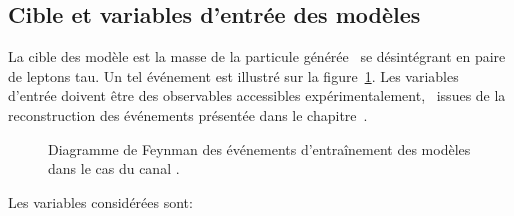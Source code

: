 \subsection{Cible et variables d'entrée des modèles}\label{chapter-ML-section-evt_gen-inputs}
La cible des modèle est la masse de la particule générée \higgsML\ se désintégrant en paire de leptons tau.
Un tel événement est illustré sur la figure~\ref{fig-model_inputs-fgraph-H-BBtautau_mutau_small}.
Les variables d'entrée doivent être des observables accessibles expérimentalement,
\ie\ issues de la reconstruction des événements présentée dans le chapitre~.
\begin{figure}[h]
\centering
{\def\Higgs{\higgsML}}
\caption[Diagramme de Feynman des événements d'entraînement des modèles.]{Diagramme de Feynman des événements d'entraînement des modèles dans le cas du canal \mu\tauh.}
\label{fig-model_inputs-fgraph-H-BBtautau_mutau_small}
\end{figure}
\par
Les variables considérées sont:
